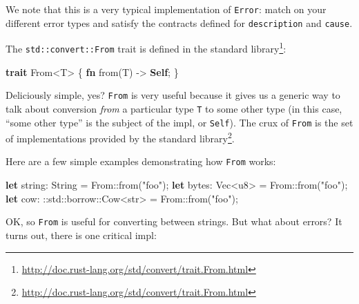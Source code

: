 \documentclass[a4paper,]{book}
\newenvironment{Shaded}{\begin{snugshade}}{\end{snugshade}}
\newcommand{\KeywordTok}[1]{\textcolor[rgb]{0.13,0.29,0.53}{\textbf{{#1}}}}
\newcommand{\DataTypeTok}[1]{\textcolor[rgb]{0.13,0.29,0.53}{{#1}}}
\newcommand{\StringTok}[1]{\textcolor[rgb]{0.31,0.60,0.02}{{#1}}}
\newcommand{\NormalTok}[1]{{#1}}
\renewcommand{\href}[2]{#2\footnote{\url{#1}}}
\begin{document}
We note that this is a very typical implementation of \texttt{Error}:
match on your different error types and satisfy the contracts defined
for \texttt{description} and \texttt{cause}.


The \texttt{std::convert::From} trait is
\href{http://doc.rust-lang.org/std/convert/trait.From.html}{defined in
the standard library}:


\begin{Shaded}
\begin{Highlighting}[]
\KeywordTok{trait} \NormalTok{From<T> \{}
    \KeywordTok{fn} \NormalTok{from(T) -> }\KeywordTok{Self}\NormalTok{;}
\NormalTok{\}}
\end{Highlighting}
\end{Shaded}

Deliciously simple, yes? \texttt{From} is very useful because it gives
us a generic way to talk about conversion \emph{from} a particular type
\texttt{T} to some other type (in this case, ``some other type'' is the
subject of the impl, or \texttt{Self}). The crux of \texttt{From} is the
\href{http://doc.rust-lang.org/std/convert/trait.From.html}{set of
implementations provided by the standard library}.

Here are a few simple examples demonstrating how \texttt{From} works:

\begin{Shaded}
\begin{Highlighting}[]
\KeywordTok{let} \NormalTok{string: }\DataTypeTok{String} \NormalTok{= From::from(}\StringTok{"foo"}\NormalTok{);}
\KeywordTok{let} \NormalTok{bytes: }\DataTypeTok{Vec}\NormalTok{<}\DataTypeTok{u8}\NormalTok{> = From::from(}\StringTok{"foo"}\NormalTok{);}
\KeywordTok{let} \NormalTok{cow: ::std::borrow::Cow<}\DataTypeTok{str}\NormalTok{> = From::from(}\StringTok{"foo"}\NormalTok{);}
\end{Highlighting}
\end{Shaded}

OK, so \texttt{From} is useful for converting between strings. But what
about errors? It turns out, there is one critical impl:
\end{document}
